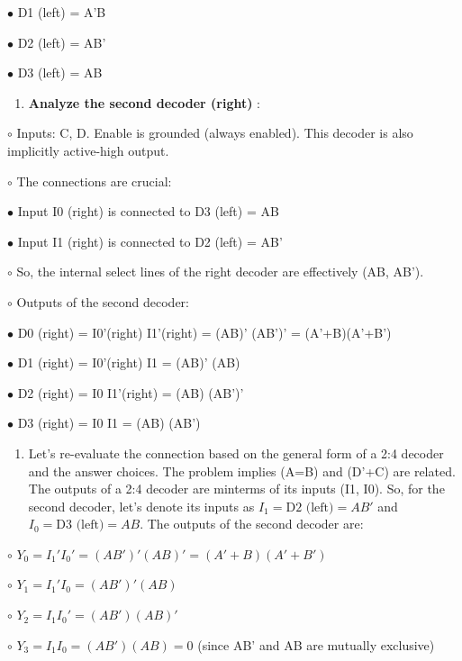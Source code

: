\documentclass{article}
\begin{document}
        $\bullet$ D1 (left) = A'B

        $\bullet$ D2 (left) = AB'

        $\bullet$ D3 (left) = AB

\begin{enumerate}
\item \textbf{Analyze the second decoder (right)} :

\end{enumerate}
    $\circ$ Inputs: C, D. Enable is grounded (always enabled). This decoder is also implicitly active-high output.

    $\circ$ The connections are crucial:

        $\bullet$ Input I0 (right) is connected to D3 (left) = AB

        $\bullet$ Input I1 (right) is connected to D2 (left) = AB'

    $\circ$ So, the internal select lines of the right decoder are effectively (AB, AB').

    $\circ$ Outputs of the second decoder:

        $\bullet$ D0 (right) = I0'(right) I1'(right) = (AB)' (AB')' = (A'+B)(A'+B')

        $\bullet$ D1 (right) = I0'(right) I1 = (AB)' (AB)

        $\bullet$ D2 (right) = I0 I1'(right) = (AB) (AB')'

        $\bullet$ D3 (right) = I0 I1 = (AB) (AB')

\begin{enumerate}
\item Let's re-evaluate the connection based on the general form of a 2:4 decoder and the answer choices. The problem implies (A=B) and (D'+C) are related. The outputs of a 2:4 decoder are minterms of its inputs (I1, I0). So, for the second decoder, let's denote its inputs as $I_1 = \text{D2 (left)} = AB'$ and $I_0 = \text{D3 (left)} = AB$. The outputs of the second decoder are:

\end{enumerate}
    $\circ$ $Y_0 = I_1' I_0' = (AB')' (AB)' = (A'+B)(A'+B')$

    $\circ$ $Y_1 = I_1' I_0 = (AB')' (AB)$

    $\circ$ $Y_2 = I_1 I_0' = (AB') (AB)'$

    $\circ$ $Y_3 = I_1 I_0 = (AB') (AB) = 0$ (since AB' and AB are mutually exclusive)
\end{document}
